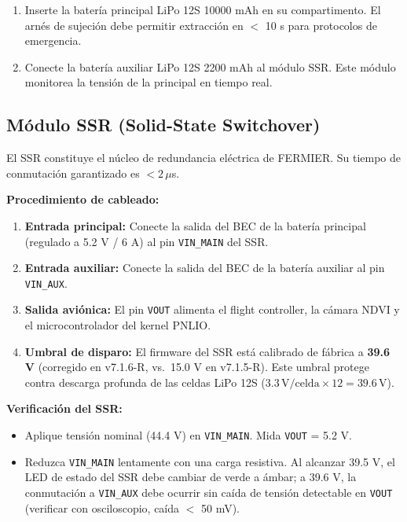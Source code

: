 \begin{enumerate}
    \item Inserte la batería principal LiPo 12S 10000 mAh en su compartimento. El arnés de sujeción debe permitir extracción en $<$ 10 s para protocolos de emergencia.
    \item Conecte la batería auxiliar LiPo 12S 2200 mAh al módulo SSR. Este módulo monitorea la tensión de la principal en tiempo real.
\end{enumerate}

\subsection{Módulo SSR (Solid-State Switchover)}

El SSR constituye el núcleo de redundancia eléctrica de FERMIER. Su tiempo de conmutación garantizado es $<2\,\mu$s.

\textbf{Procedimiento de cableado:}
\begin{enumerate}
    \item \textbf{Entrada principal:} Conecte la salida del BEC de la batería principal (regulado a 5.2 V / 6 A) al pin \texttt{VIN\_MAIN} del SSR.
    \item \textbf{Entrada auxiliar:} Conecte la salida del BEC de la batería auxiliar al pin \texttt{VIN\_AUX}.
    \item \textbf{Salida aviónica:} El pin \texttt{VOUT} alimenta el flight controller, la cámara NDVI y el microcontrolador del kernel PNLIO.
    \item \textbf{Umbral de disparo:} El firmware del SSR está calibrado de fábrica a \textbf{39.6 V} (corregido en v7.1.6-R, vs.\ 15.0 V en v7.1.5-R). Este umbral protege contra descarga profunda de las celdas LiPo 12S ($3.3\,\text{V/celda} \times 12 = 39.6\,\text{V}$).
\end{enumerate}

\textbf{Verificación del SSR:}
\begin{itemize}
    \item Aplique tensión nominal (44.4 V) en \texttt{VIN\_MAIN}. Mida \texttt{VOUT} = 5.2 V.
    \item Reduzca \texttt{VIN\_MAIN} lentamente con una carga resistiva. Al alcanzar 39.5 V, el LED de estado del SSR debe cambiar de verde a ámbar; a 39.6 V, la conmutación a \texttt{VIN\_AUX} debe ocurrir sin caída de tensión detectable en \texttt{VOUT} (verificar con osciloscopio, caída $<$ 50 mV).
\end{itemize}

